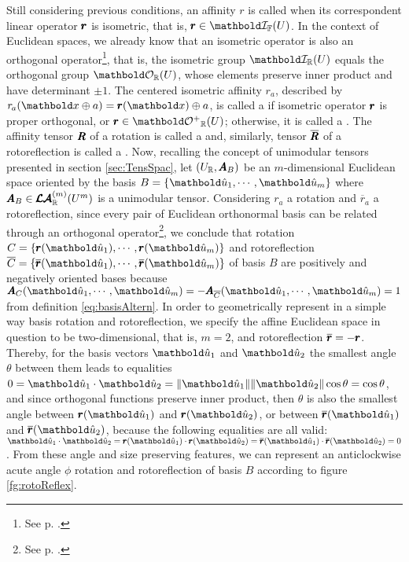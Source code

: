 Still considering previous conditions, an affinity $\mathit{r}$ is called  when its correspondent linear operator $\pmb{r}$ is isometric, that is, $\vtf{r}\in\grc{I}{\cam{F}}{U}$. In the context of Euclidean spaces, we already know that an isometric operator is also an orthogonal operator\footnote{See p. \pageref{prg:IsometOrth}.}, that is, the isometric group $\grc{I}{\real}{U}$ equals the orthogonal group $\grc{O}{\real}{U}$, whose elements preserve inner product and have determinant $\pm 1$. The centered isometric affinity $\mathit{r}_a$, described by $\fua{\mathit{r}_a}{\vto{x}\oplus a}=\fua{\vtf{r}}{\vto{x}}\oplus a$, is called a  if isometric operator $\pmb{r}$ is proper orthogonal, or $\vtf{r}\in\grc{O^+}{\real}{U}$; otherwise, it is called a . The affinity tensor $\pmb{R}$ of a rotation is called a  and, similarly, tensor $\overline{\pmb{R}}$ of a rotoreflection is called a . Now, recalling the concept of unimodular tensors presented in section \ref{sec:TensSpac}, let $(U_{\mathbb{R}},\pmb{A}_B)$ be an $m$-dimensional Euclidean space oriented by the basis $B=\{\vun{u}_1,\cdots,\vun{u}_m\}$ where $\pmb{A}_B\in\pmb{\mathcal{LA}}^{(m)}_{\mathbb{R}}(U^m)$ is a unimodular tensor. Considering $\mathit{r}_a$ a rotation and $\overline{\mathit{r}}_a$ a rotoreflection, since every pair of Euclidean orthonormal basis can be related through an orthogonal operator\footnote{See p. \pageref{prg:orthBases}.}, we conclude that rotation  $C=\{\fua{\vtf{r}}{\vun{u}_1},\cdots,\fua{\vtf{r}}{\vun{u}_m}\}$ and rotoreflection $\overline{C}=\{\fua{\overline{\vtf{r}}}{\vun{u}_1},\cdots,\fua{\overline{\vtf{r}}}{\vun{u}_m}\}$ of basis $B$ are positively and negatively oriented bases because $\fua{\tnr{A}_C}{\vun{u}_1,\cdots,\vun{u}_m}=-\fua{\tnr{A}_{\overline{C}}}{\vun{u}_1,\cdots,\vun{u}_m}=1$ from definition \eqref{eq:basisAltern}. In order to geometrically represent in a simple way basis rotation and rotoreflection, we specify the affine Euclidean space in question to be two-dimensional, that is, $m=2$, and rotoreflection $\overline{\pmb{r}}=-\pmb{r}$. Thereby, for the basis vectors $\vun{u}_1$ and $\vun{u}_2$ the smallest angle $\theta$ between them leads to equalities $0=\vun{u}_1\cdot\vun{u}_2=\|\vun{u}_1\|\|\vun{u}_2\|\cos\theta=\cos\theta$, and since orthogonal functions preserve inner product, then $\theta$ is also the smallest angle between $\fua{\vtf{r}}{\vun{u}_1}$ and $\fua{\vtf{r}}{\vun{u}_2}$, or between $\fua{\overline{\vtf{r}}}{\vun{u}_1}$ and $\fua{\overline{\vtf{r}}}{\vun{u}_2}$, because the following equalities are all valid: $\vun{u}_1\cdot\vun{u}_2=\fua{\vtf{r}}{\vun{u}_1}\cdot\fua{\vtf{r}}{\vun{u}_2}=\fua{\overline{\vtf{r}}}{\vun{u}_1}\cdot\fua{\overline{\vtf{r}}}{\vun{u}_2}=0$. From these angle and size preserving features, we can represent an anticlockwise acute angle $\phi$ rotation and rotoreflection of basis $B$ according to figure \ref{fg:rotoReflex}.
